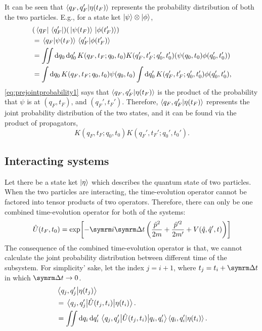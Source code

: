 It can be seen that $\braket{q_F, q_F'}{\eta(t_F)}$ represents the probability distribution of both the two particles. E.g., for a state ket $\ket{\psi}\otimes\ket{\phi}$,
\begin{align}
    & (\bra*{q_F}\bra*{q_F'})(\ket*{\psi(t_F)}\ket*{\phi(t_F')}) \\
    &= \braket*{q_F}{\psi(t_F)}\braket*{q_F'}{\phi(t_F')} \label{eq:prejointprobability1}\\
    &= \iint\dd{q_0}\dd{q_0'}K(q_F, t_F; q_0, t_0)K(q_F', t_F';q_0', t_0')(\psi(q_0, t_0)\phi(q_0', t_0')) \\
    &= \int\dd{q_0}K(q_F, t_F; q_0, t_0)\psi(q_0, t_0)\int\dd{q_0'}K(q_F', t_F';q_0', t_0')\phi(q_0', t_0'), \label{eq:prejointprobability2}
\end{align}
\cref{eq:prejointprobability1} says that $\braket{q_F, q_F'}{\eta(t_F)}$ is the product of the probability that $\psi$ is at $(q_F, t_F)$, and $(q_F', t_F')$. Therefore, $\braket{q_F, q_F'}{\eta(t_F)}$ represents the joint probability distribution of the two states, and it can be found via the product of propagators,
\begin{equation}
    K(q_F, t_F; q_0, t_0)K(q_F', t_F';q_0', t_0').
\end{equation}


\subsection{Interacting systems}

Let there be a state ket $\ket{\eta}$ which describes the quantum state of two particles. When the two particles are interacting, the time-evolution operator cannot be factored into tensor products of two operators. Therefore, there can only be one combined time-evolution operator for both of the systems:
\begin{equation}
    \hat{U}(t_F, t_0) = \exp[-\im\Dd{t}\left(\frac{\hat{p}^2}{2m} + \frac{\hat{p}'^2}{2m'} + V(\hat{q}, \hat{q}', t)\right)]
\end{equation}
The consequence of the combined time-evolution operator is that, we cannot calculate the joint probability distribution between different time of the subsystem. For simplicity’ sake, let the index $j = i + 1$, where $t_j = t_i + \Dd{t}$ in which $\Dd{t} \appr 0$.
\begin{align}
    &\braket{q_j, q_j'}{\eta(t_j)} \\
    &= \mel{q_j, q_j'}{\hat{U}(t_j, t_i)}{\eta(t_i)}. \\
    &= \iint \dd{q_i}\dd{q_i'} \mel{q_j, q_j'}{\hat{U}(t_j, t_i)}{q_i, q_i'}\braket{q_i, q_i'}{\eta(t_i)}.
\end{align}


